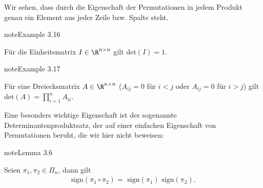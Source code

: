 \documentclass[letterpaper,10pt,english]{jupyterBook}
\begin{document}
Wir sehen, dass durch die Eigenschaft der Permutationen in jedem Produkt genau ein Element aus jeder Zeile bzw. Spalte steht.
\label{vektorraeume/LGS:example-13}
\begin{sphinxadmonition}{note}{Example 3.16}



Für die Einheitsmatrix \(I \in \R^{n \times n}\) gilt det\((I)=1\).
\end{sphinxadmonition}
\label{vektorraeume/LGS:example-14}
\begin{sphinxadmonition}{note}{Example 3.17}



Für eine Dreiecksmatrix  \(A \in \R^{n \times n}\) (\(A_{ij} = 0\) für \(i< j\) oder \(A_{ij} = 0\) für \(i> j\)) gilt det\((A)=\prod_{i=1}^n A_{ii}\).
\end{sphinxadmonition}

Eine besonders wichtige Eigenschaft ist der sogenannte Determinantenproduktsatz, der auf einer einfachen Eigenschaft von Permutationen beruht, die wir hier nicht beweisen:
\label{vektorraeume/LGS:lemma-15}
\begin{sphinxadmonition}{note}{Lemma 3.6}



Seien \(\pi_1, \pi_2 \in \Pi_n\), dann gilt
\begin{equation*}
\begin{split}  \text{sign}(\pi_1 \circ \pi_2) = \text{ sign}(\pi_1) \text{ sign}(\pi_2).\end{split}
\end{equation*}\end{sphinxadmonition}
\end{document}
